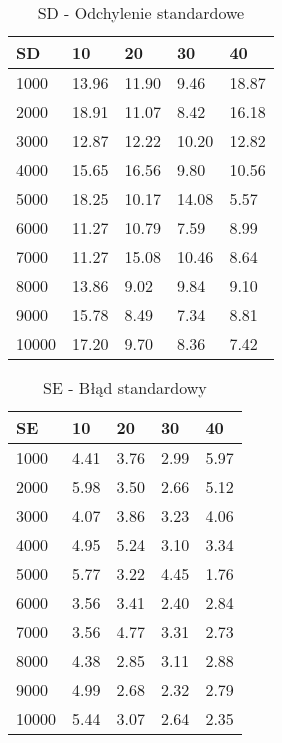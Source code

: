  \begin{table}[!ht]
    \centering
    \begin{tabular}{|l|l|l|l|l|}
    \hline
        SD & 10 & 20 & 30 & 40 \\ \hline
        1000 & 13.96 & 11.90 & 9.46 & 18.87 \\ \hline
        2000 & 18.91 & 11.07 & 8.42 & 16.18 \\ \hline
        3000 & 12.87 & 12.22 & 10.20 & 12.82 \\ \hline
        4000 & 15.65 & 16.56 & 9.80 & 10.56 \\ \hline
        5000 & 18.25 & 10.17 & 14.08 & 5.57 \\ \hline
        6000 & 11.27 & 10.79 & 7.59 & 8.99 \\ \hline
        7000 & 11.27 & 15.08 & 10.46 & 8.64 \\ \hline
        8000 & 13.86 & 9.02 & 9.84 & 9.10 \\ \hline
        9000 & 15.78 & 8.49 & 7.34 & 8.81 \\ \hline
        10000 & 17.20 & 9.70 & 8.36 & 7.42 \\ \hline
    \end{tabular}
    \caption{SD - Odchylenie standardowe}
  \end{table}

  \begin{table}[!ht]
    \centering
    \begin{tabular}{|l|l|l|l|l|}
    \hline
        SE & 10 & 20 & 30 & 40 \\ \hline
        1000 & 4.41 & 3.76 & 2.99 & 5.97 \\ \hline
        2000 & 5.98 & 3.50 & 2.66 & 5.12 \\ \hline
        3000 & 4.07 & 3.86 & 3.23 & 4.06 \\ \hline
        4000 & 4.95 & 5.24 & 3.10 & 3.34 \\ \hline
        5000 & 5.77 & 3.22 & 4.45 & 1.76 \\ \hline
        6000 & 3.56 & 3.41 & 2.40 & 2.84 \\ \hline
        7000 & 3.56 & 4.77 & 3.31 & 2.73 \\ \hline
        8000 & 4.38 & 2.85 & 3.11 & 2.88 \\ \hline
        9000 & 4.99 & 2.68 & 2.32 & 2.79 \\ \hline
        10000 & 5.44 & 3.07 & 2.64 & 2.35 \\ \hline
    \end{tabular}
    \caption{SE - Błąd standardowy}
  \end{table}

